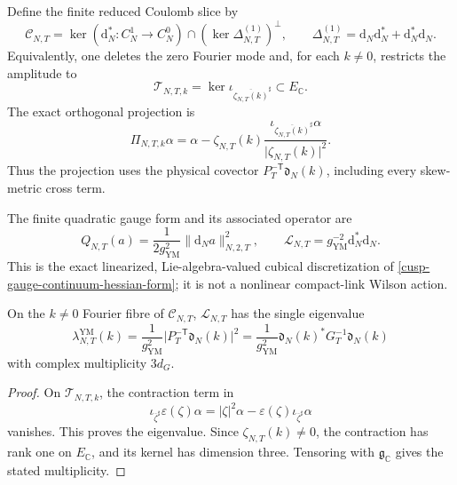Define the finite reduced Coulomb slice by
\begin{equation}
 \mathscr C_{N,T}
 =\ker(\mathrm d_N^*:C_N^1\to C_N^0)
  \cap(\ker\Delta_{N,T}^{(1)})^\perp,
 \qquad
 \Delta_{N,T}^{(1)}
 =\mathrm d_N\mathrm d_N^*+\mathrm d_N^*\mathrm d_N.
 \label{cusp-gauge-finite-reduced-coulomb}
\end{equation}
Equivalently, one deletes the zero Fourier mode and, for each \(k\ne0\),
restricts the amplitude to
\begin{equation}
 \mathcal T_{N,T,k}
 =\ker\iota_{\overline{\zeta_{N,T}(k)}^\sharp}
 \subset E_{\mathbb C}.
 \label{cusp-gauge-finite-transverse-space}
\end{equation}
The exact orthogonal projection is
\begin{equation}
 \Pi_{N,T,k}\alpha
 =\alpha-\zeta_{N,T}(k)
 \frac{
  \iota_{\overline{\zeta_{N,T}(k)}^\sharp}\alpha
 }{\lvert\zeta_{N,T}(k)\rvert^2}.
 \label{cusp-gauge-finite-coulomb-projection}
\end{equation}
Thus the projection uses the physical covector
\(P_T^{-\mathsf T}\mathfrak d_N(k)\), including every skew-metric cross term.

The finite quadratic gauge form and its associated operator are
\begin{equation}
 Q_{N,T}(a)
 =\frac1{2g_{\mathrm{YM}}^2}
   \lVert\mathrm d_Na\rVert_{N,2,T}^2,
 \qquad
 \mathcal L_{N,T}
 =g_{\mathrm{YM}}^{-2}\mathrm d_N^*\mathrm d_N.
 \label{cusp-gauge-finite-quadratic-form}
\end{equation}
This is the exact linearized, Lie-algebra-valued cubical discretization of
\cref{cusp-gauge-continuum-hessian-form}; it is not a nonlinear
compact-link Wilson action.

\begin{corollary}
\label{cusp-gauge-finite-spectrum}
On the \(k\ne0\) Fourier fibre of \(\mathscr C_{N,T}\),
\(\mathcal L_{N,T}\) has the single eigenvalue
\begin{equation}
 \lambda_{N,T}^{\mathrm{YM}}(k)
 =\frac1{g_{\mathrm{YM}}^2}
  \lvert P_T^{-\mathsf T}\mathfrak d_N(k)\rvert^2
 =\frac1{g_{\mathrm{YM}}^2}
  \mathfrak d_N(k)^*G_T^{-1}\mathfrak d_N(k)
 \label{cusp-gauge-finite-mode-eigenvalue}
\end{equation}
with complex multiplicity \(3d_G\).
\end{corollary}

\begin{proof}
On \(\mathcal T_{N,T,k}\), the contraction term in
\[
 \iota_{\overline\zeta^\sharp}\varepsilon(\zeta)\alpha
 =\lvert\zeta\rvert^2\alpha
  -\varepsilon(\zeta)\iota_{\overline\zeta^\sharp}\alpha
\]
vanishes.  This proves the eigenvalue.  Since \(\zeta_{N,T}(k)\ne0\), the
contraction has rank one on \(E_{\mathbb C}\), and its kernel has dimension
three.  Tensoring with \(\mathfrak g_{\mathbb C}\) gives the stated
multiplicity.
\end{proof}

